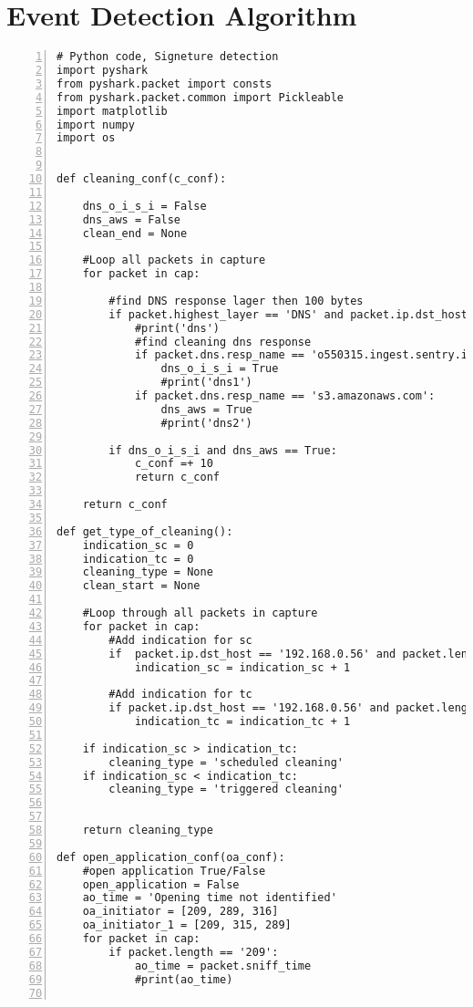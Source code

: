 \chapter{Event Detection Algorithm}
\label{app:DetectionAlgorithm}

\begin{lstlisting}[numbers=left]
# Python code, Signeture detection
import pyshark
from pyshark.packet import consts
from pyshark.packet.common import Pickleable
import matplotlib
import numpy
import os


def cleaning_conf(c_conf):
    
    dns_o_i_s_i = False
    dns_aws = False
    clean_end = None
    
    #Loop all packets in capture
    for packet in cap:

        #find DNS response lager then 100 bytes 
        if packet.highest_layer == 'DNS' and packet.ip.dst_host == wan_addr:
            #print('dns')
            #find cleaning dns response
            if packet.dns.resp_name == 'o550315.ingest.sentry.io':
                dns_o_i_s_i = True
                #print('dns1')
            if packet.dns.resp_name == 's3.amazonaws.com':
                dns_aws = True
                #print('dns2')
    
        if dns_o_i_s_i and dns_aws == True:
            c_conf =+ 10
            return c_conf

    return c_conf

def get_type_of_cleaning():
    indication_sc = 0
    indication_tc = 0
    cleaning_type = None
    clean_start = None

    #Loop through all packets in capture
    for packet in cap:
        #Add indication for sc
        if  packet.ip.dst_host == '192.168.0.56' and packet.length == ('1101' or '1107'):
            indication_sc = indication_sc + 1
            
        #Add indication for tc
        if packet.ip.dst_host == '192.168.0.56' and packet.length == ('1105' or '1106' or '1099'):
            indication_tc = indication_tc + 1

    if indication_sc > indication_tc:
        cleaning_type = 'scheduled cleaning'
    if indication_sc < indication_tc:
        cleaning_type = 'triggered cleaning'
    

    return cleaning_type

def open_application_conf(oa_conf):
    #open application True/False
    open_application = False
    ao_time = 'Opening time not identified'
    oa_initiator = [209, 289, 316]
    oa_initiator_1 = [209, 315, 289]
    for packet in cap:
        if packet.length == '209':
            ao_time = packet.sniff_time
            #print(ao_time)
    

\end{lstlisting}
